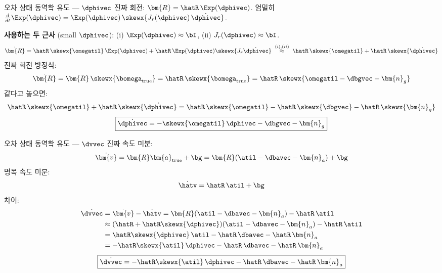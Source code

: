 \begin{frame}[shrink=10]{오차 상태 동역학 유도 — $\dphivec$}
  진짜 회전: $\bm{R} = \hatR\,\Exp(\dphivec)$.\;
  엄밀히 $\frac{d}{dt}\Exp(\dphivec) = \Exp(\dphivec)\,\skewx{J_r(\dphivec)\,\dot{\dphivec}}$.

  \vspace{0.2em}
  \textbf{사용하는 두 근사} (small $\dphivec$): \;\;
  (i) $\Exp(\dphivec) \approx \bI$, \;\;
  (ii) $J_r(\dphivec) \approx \bI$.
  \[
    \dot{\bm{R}} = \hatR\,\skewx{\omegatil}\,\Exp(\dphivec) + \hatR\,\Exp(\dphivec)\skewx{J_r\dot{\dphivec}}
    \;\overset{(i),(ii)}{\approx}\; \hatR\,\skewx{\omegatil} + \hatR\,\skewx{\dot{\dphivec}}
  \]
  진짜 회전 방정식:
  \[
    \dot{\bm{R}} = \bm{R}\,\skewx{\bomega_\text{true}} = \hatR\,\skewx{\bomega_\text{true}}
    = \hatR\,\skewx{\omegatil - \dbgvec - \bm{n}_g}
  \]
  \pause
  같다고 놓으면:
  \[
    \hatR\,\skewx{\omegatil} + \hatR\,\skewx{\dot{\dphivec}}
    = \hatR\,\skewx{\omegatil} - \hatR\,\skewx{\dbgvec} - \hatR\,\skewx{\bm{n}_g}
  \]
  \[
    \boxed{\dot{\dphivec} = -\skewx{\omegatil}\,\dphivec - \dbgvec - \bm{n}_g}
  \]
\end{frame}

\begin{frame}{오차 상태 동역학 유도 — $\dvvec$}
  진짜 속도 미분:
  \[
    \dot{\bm{v}} = \bm{R}\bm{a}_\text{true} + \bg = \bm{R}(\atil - \dbavec - \bm{n}_a) + \bg
  \]
  명목 속도 미분:
  \[
    \dot{\hatv} = \hatR\,\atil + \bg
  \]
  \pause
  차이:
  \begin{align*}
    \dot{\dvvec} &= \dot{\bm{v}} - \dot{\hatv}
    = \bm{R}(\atil-\dbavec-\bm{n}_a) - \hatR\,\atil \\
    &\approx (\hatR + \hatR\skewx{\dphivec})(\atil-\dbavec-\bm{n}_a) - \hatR\,\atil \\
    &= \hatR\skewx{\dphivec}\,\atil - \hatR\,\dbavec - \hatR\,\bm{n}_a \\
    &= -\hatR\skewx{\atil}\,\dphivec - \hatR\,\dbavec - \hatR\,\bm{n}_a
  \end{align*}
  \[
    \boxed{\dot{\dvvec} = -\hatR\skewx{\atil}\,\dphivec - \hatR\,\dbavec - \hatR\,\bm{n}_a}
  \]
\end{frame}

